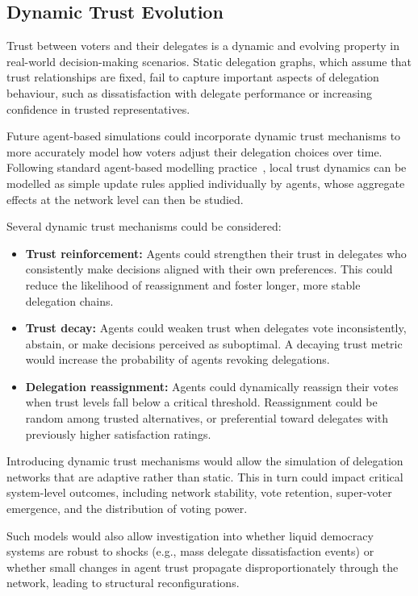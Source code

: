 \subsection{Dynamic Trust Evolution}

Trust between voters and their delegates is a dynamic and evolving property in real-world decision-making scenarios. Static delegation graphs, which assume that trust relationships are fixed, fail to capture important aspects of delegation behaviour, such as dissatisfaction with delegate performance or increasing confidence in trusted representatives.

Future agent-based simulations could incorporate dynamic trust mechanisms to more accurately model how voters adjust their delegation choices over time. Following standard agent-based modelling practice~\citep{bonabeau2002agent}, local trust dynamics can be modelled as simple update rules applied individually by agents, whose aggregate effects at the network level can then be studied.

Several dynamic trust mechanisms could be considered:

\begin{itemize}
\item \textbf{Trust reinforcement:} Agents could strengthen their trust in delegates who consistently make decisions aligned with their own preferences. This could reduce the likelihood of reassignment and foster longer, more stable delegation chains.
\item \textbf{Trust decay:} Agents could weaken trust when delegates vote inconsistently, abstain, or make decisions perceived as suboptimal. A decaying trust metric would increase the probability of agents revoking delegations.
\item \textbf{Delegation reassignment:} Agents could dynamically reassign their votes when trust levels fall below a critical threshold. Reassignment could be random among trusted alternatives, or preferential toward delegates with previously higher satisfaction ratings.
\end{itemize}

Introducing dynamic trust mechanisms would allow the simulation of delegation networks that are adaptive rather than static. This in turn could impact critical system-level outcomes, including network stability, vote retention, super-voter emergence, and the distribution of voting power.

Such models would also allow investigation into whether liquid democracy systems are robust to shocks (e.g., mass delegate dissatisfaction events) or whether small changes in agent trust propagate disproportionately through the network, leading to structural reconfigurations.

